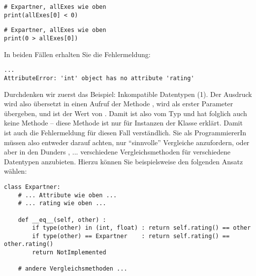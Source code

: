 \begin{minipage}{.49\linewidth}
\begin{warnbox}[Beispiel: Inkompatible Datentypen (1), leftupper=7mm]
\begin{verbatim}
# Expartner, allExes wie oben
print(allExes[0] < 0)
\end{verbatim}
\end{warnbox}
\end{minipage}
%
\begin{minipage}{.49\linewidth}
\begin{warnbox}[Beispiel: Inkompatible Datentypen (2), leftupper=7mm]
\begin{verbatim}
# Expartner, allExes wie oben
print(0 > allExes[0])
\end{verbatim}
\end{warnbox}
\end{minipage}

In beiden Fällen erhalten Sie die Fehlermeldung:
\begin{cmdbox}
\begin{verbatim}
...
AttributeError: 'int' object has no attribute 'rating'
\end{verbatim}
\end{cmdbox}

Durchdenken wir zuerst das Beispiel: Inkompatible Datentypen (1). Der Ausdruck  wird also übersetzt in einen Aufruf der Methode , \ie {} wird als erster Parameter  übergeben, und  ist der Wert von . Damit ist  also vom Typ  und hat folglich auch keine Methode  -- diese Methode ist nur für Instanzen der Klasse  erklärt. Damit ist auch die Fehlermeldung für diesen Fall verständlich. Sie als ProgrammiererIn müssen also entweder darauf achten, nur \enquote{sinnvolle} Vergleiche anzufordern, oder aber in den Dunders , ... verschiedene Vergleichsmethoden für verschiedene Datentypen anzubieten. Hierzu können Sie beispielsweise den folgenden Ansatz wählen:

\begin{codebox}
\begin{verbatim}
class Expartner:
    # ... Attribute wie oben ...
    # ... rating wie oben ...
    
    def __eq__(self, other) :
        if type(other) in (int, float) : return self.rating() == other
        if type(other) == Expartner    : return self.rating() == other.rating()
        return NotImplemented
    
    # andere Vergleichsmethoden ...
\end{verbatim}
\end{codebox}

